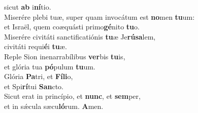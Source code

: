\oddverse sicut \textbf{ab} i\textbf{ní}tio.\\
\evenverse Miserére plebi tuæ, super quam invocátum est \textbf{no}men \textbf{tu}um:~\*\\
\evenverse et Israël, quem coæquásti primo\textbf{gé}nito \textbf{tu}o.\\
\oddverse Miserére civitáti sanctificatiónis \textbf{tu}æ Je\textbf{rú}\textbf{sa}lem,~\*\\
\oddverse civitáti requi\textbf{é}i \textbf{tu}æ.\\
\evenverse Reple Sion inenarrabílibus \textbf{ver}bis \textbf{tu}is,~\*\\
\evenverse et glória tua \textbf{pó}pulum \textbf{tu}um.\\
\oddverse Glória \textbf{Pa}tri, et \textbf{Fí}\textbf{li}o,~\*\\
\oddverse et Spi\textbf{rí}tui \textbf{San}cto.\\
\evenverse Sicut erat in princípio, et \textbf{nunc}, et \textbf{sem}per,~\*\\
\evenverse et in sǽcula sæcu\textbf{ló}rum. \textbf{A}men.\\
